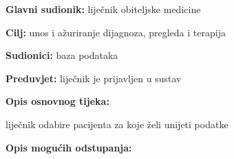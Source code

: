                     \noindent {}
					\begin{packed_item}
	
						\item \textbf{Glavni sudionik: }liječnik obiteljske medicine
						\item  \textbf{Cilj:} unos i ažuriranje dijagnoza, pregleda i terapija
						\item  \textbf{Sudionici:} baza podataka
						\item  \textbf{Preduvjet:} liječnik je prijavljen u sustav
						\item  \textbf{Opis osnovnog tijeka:}
						
						\item[] \begin{packed_enum}
	
							\item liječnik odabire pacijenta za koje želi unijeti podatke
							\item 
							\item 

						\end{packed_enum}
						
						\item  \textbf{Opis mogućih odstupanja:}
						
						\item[] \begin{packed_item}
	
							\item[2.a] 
							\item[] \begin{packed_enum}
								
								\item 
								\item 
							\end{packed_enum}
							
						\end{packed_item}
					\end{packed_item}

